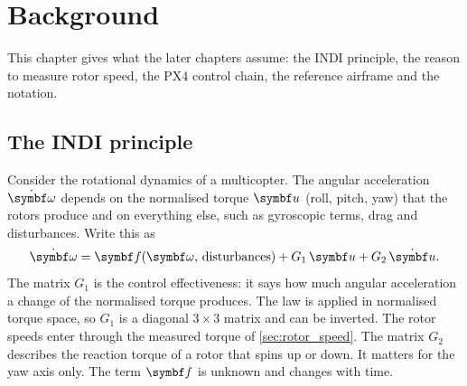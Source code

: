 \chapter{Background}\label{ch:background}

This chapter gives what the later chapters assume: the INDI principle, the reason to measure rotor speed, the PX4 control chain, the reference airframe and the notation.

\section{The INDI principle}\label{sec:indi_principle}

Consider the rotational dynamics of a multicopter.
The angular acceleration $\dot{\vect\omega}$ depends on the normalised torque $\vect{u}$ (roll, pitch, yaw) that the rotors produce and on everything else, such as gyroscopic terms, drag and disturbances.
Write this as
\begin{equation}\label{eq:plant}
  \dot{\vect\omega} = \vect{f}(\vect\omega,\,\text{disturbances}) + G_1\,\vect{u} + G_2\,\dot{\vect{u}} .
\end{equation}
The matrix $G_1$ is the control effectiveness: it says how much angular acceleration a change of the normalised torque produces.
The law is applied in normalised torque space, so $G_1$ is a diagonal $3\times3$ matrix and can be inverted.
The rotor speeds enter through the measured torque of \cref{sec:rotor_speed}.
The matrix $G_2$ describes the reaction torque of a rotor that spins up or down.
It matters for the yaw axis only.
The term $\vect{f}$ is unknown and changes with time.


